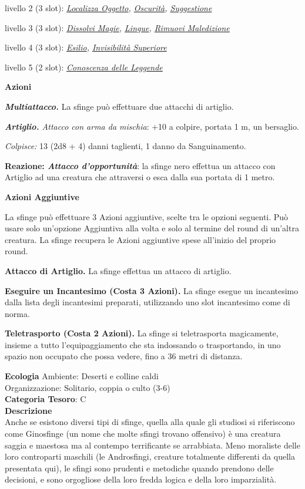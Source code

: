 \begin{multicols}{2}
{livello 2 (3 slot): \emph{\hyperlink{Localizza Oggetto}{Localizza Oggetto}, \hyperlink{Oscurità}{Oscurità}, \hyperlink{Suggestione}{Suggestione}}

livello 3 (3 slot): \emph{\hyperlink{Dissolvi Magie}{Dissolvi Magie}, \hyperlink{Lingue}{Lingue}, \hyperlink{Rimuovi Maledizione}{Rimuovi Maledizione}}

livello 4 (3 slot): \emph{\hyperlink{Esilio}{Esilio}, \hyperlink{Invisibilità Superiore}{Invisibilità Superiore}}

livello 5 (2 slot): \emph{\hyperlink{Conoscenza delle Leggende}{Conoscenza delle Leggende}}

\textbf{Azioni}

\emph{\textbf{Multiattacco.}} La sfinge può effettuare due attacchi di artiglio.

\emph{\textbf{Artiglio.} Attacco con arma da mischia}: +10 a colpire, portata 1 m, un bersaglio.

\emph{Colpisce:} 13 (2d8 + 4) danni taglienti, 1 danno da Sanguinamento.

\textbf{Reazione: \emph{Attacco d'opportunità}}: la sfinge nero effettua un attacco con Artiglio ad una creatura che attraversi o esca dalla sua portata di 1 metro.

\textbf{Azioni Aggiuntive}

La sfinge può effettuare 3 Azioni aggiuntive, scelte tra le opzioni seguenti. Può usare solo un'opzione Aggiuntiva alla volta e solo al termine del round di un'altra creatura. La sfinge recupera le Azioni aggiuntive spese all'inizio del proprio round.

\textbf{Attacco di Artiglio.} La sfinge effettua un attacco di artiglio.

\textbf{Eseguire un Incantesimo (Costa 3 Azioni).} La sfinge esegue un incantesimo dalla lista degli incantesimi preparati, utilizzando uno slot incantesimo come di norma.

\textbf{Teletrasporto (Costa 2 Azioni).} La sfinge si teletrasporta magicamente, insieme a tutto l'equipaggiamento che sta indossando o trasportando, in uno spazio non occupato che possa vedere, fino a 36 metri di distanza.

\textbf{Ecologia}
Ambiente: Deserti e colline caldi\\
Organizzazione: Solitario, coppia o culto (3-6)\\
\textbf{Categoria Tesoro}: C\\
\textbf{Descrizione}\\
Anche se esistono diversi tipi di sfinge, quella alla quale gli studiosi si riferiscono come Ginosfinge (un nome che molte sfingi trovano offensivo) è una creatura saggia e maestosa ma al contempo terrificante se arrabbiata. Meno moraliste delle loro controparti maschili (le Androsfingi, creature totalmente differenti da quella presentata qui), le sfingi sono prudenti e metodiche quando prendono delle decisioni, e sono orgogliose della loro fredda logica e della loro imparzialità.

}
\end{multicols}
